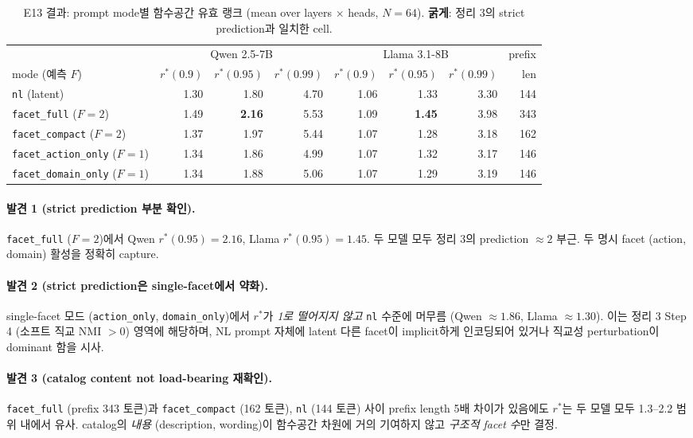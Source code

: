 \documentclass[11pt]{article}
\theoremstyle{definition}
\begin{document}
\begin{table}[h]
\centering
\caption{E13 결과: prompt mode별 함수공간 유효 랭크 (mean over layers $\times$ heads, $N=64$). \textbf{굵게}: 정리 3의 strict prediction과 일치한 cell.}
\label{tab:e13}
\small
\begin{tabular}{l|rrr|rrr|r}
\toprule
& \multicolumn{3}{c|}{Qwen 2.5-7B} & \multicolumn{3}{c|}{Llama 3.1-8B} & prefix \\
mode (예측 $F$) & $r^*(0.9)$ & $r^*(0.95)$ & $r^*(0.99)$ & $r^*(0.9)$ & $r^*(0.95)$ & $r^*(0.99)$ & len \\
\midrule
\texttt{nl} (latent)              & 1.30 & 1.80 & 4.70 & 1.06 & 1.33 & 3.30 & 144 \\
\texttt{facet\_full} ($F{=}2$)    & 1.49 & \textbf{2.16} & 5.53 & 1.09 & \textbf{1.45} & 3.98 & 343 \\
\texttt{facet\_compact} ($F{=}2$) & 1.37 & 1.97 & 5.44 & 1.07 & 1.28 & 3.18 & 162 \\
\texttt{facet\_action\_only} ($F{=}1$) & 1.34 & 1.86 & 4.99 & 1.07 & 1.32 & 3.17 & 146 \\
\texttt{facet\_domain\_only} ($F{=}1$) & 1.34 & 1.88 & 5.06 & 1.07 & 1.29 & 3.19 & 146 \\
\bottomrule
\end{tabular}
\end{table}

\paragraph{발견 1 (strict prediction 부분 확인).}
\texttt{facet\_full} ($F=2$)에서 Qwen $r^*(0.95) = 2.16$, Llama $r^*(0.95) = 1.45$. 두 모델 모두 정리 3의 prediction $\approx 2$ 부근. 두 명시 facet (action, domain) 활성을 정확히 capture.

\paragraph{발견 2 (strict prediction은 single-facet에서 약화).}
single-facet 모드 (\texttt{action\_only}, \texttt{domain\_only})에서 $r^*$가 \emph{1로 떨어지지 않고} \texttt{nl} 수준에 머무름 (Qwen $\approx 1.86$, Llama $\approx 1.30$). 이는 정리 3 Step 4 (소프트 직교 NMI $> 0$) 영역에 해당하며, NL prompt 자체에 latent 다른 facet이 implicit하게 인코딩되어 있거나 직교성 perturbation이 dominant 함을 시사.

\paragraph{발견 3 (catalog content not load-bearing 재확인).}
\texttt{facet\_full} (prefix 343 토큰)과 \texttt{facet\_compact} (162 토큰), \texttt{nl} (144 토큰) 사이 prefix length 5배 차이가 있음에도 $r^*$는 두 모델 모두 1.3--2.2 범위 내에서 유사. catalog의 \emph{내용} (description, wording)이 함수공간 차원에 거의 기여하지 않고 \emph{구조적 facet 수}만 결정.
\end{document}
